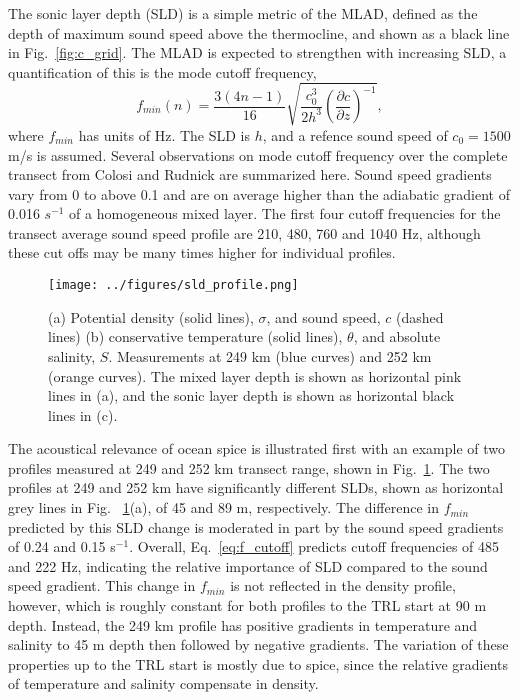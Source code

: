 \documentclass[preprint,NumberedRefs]{JASA}
\begin{document}
The sonic layer depth (SLD) is a simple metric of the MLAD, defined as the depth of maximum sound speed above the thermocline, and shown as a black line in Fig.~\ref{fig:c_grid}. The MLAD is expected to strengthen with increasing SLD, a quantification of this is the mode cutoff frequency\citep{Urick1982Prop},
\begin{equation}
    f_{min}(n) = \frac{3(4n-1)}{16} \sqrt{\frac{c_0^3}{2h^3} \left( \frac{\partial c}{\partial z} \right) ^ {-1}},
    \label{eq:f_cutoff}
\end{equation}
where $f_{min}$ has units of Hz. The SLD is $h$, and a refence sound speed of $c_0 = 1500$ m/s is assumed. Several observations on mode cutoff frequency over the complete transect from Colosi and Rudnick\cite{colosi2020observations} are summarized here. Sound speed gradients vary from 0 to above 0.1 and are on average higher than the adiabatic gradient of 0.016 $s^{-1}$ of a homogeneous mixed layer. The first four cutoff frequencies for the transect average sound speed profile are 210, 480, 760 and 1040 Hz, although these cut offs may be many times higher for individual profiles.

\begin{figure}
    \texttt{[image: ../figures/sld\_profile.png]}
    \caption{\label{fig:profiles}{(a) Potential density (solid lines), $\sigma$, and sound speed, $c$ (dashed lines) (b) conservative temperature (solid lines), $\theta$, and absolute salinity, $S$. Measurements at 249 km (blue curves) and 252 km (orange curves). The mixed layer depth is shown as horizontal pink lines in (a), and the sonic layer depth is shown as horizontal black lines in (c).}}
\end{figure}

The acoustical relevance of ocean spice is illustrated first with an example of two profiles measured at 249 and 252 km transect range, shown in Fig.~\ref{fig:profiles}. The two profiles at 249 and 252 km have significantly different SLDs, shown as horizontal grey lines in Fig. ~\ref{fig:profiles}(a), of 45 and 89 m, respectively. The difference in $f_{min}$ predicted by this SLD change is moderated in part by the sound speed gradients of 0.24 and 0.15 s$^{-1}$. Overall, Eq.~\eqref{eq:f_cutoff} predicts cutoff frequencies of 485 and 222 Hz, indicating the relative importance of SLD compared to the sound speed gradient. This change in $f_{min}$ is not reflected in the density profile, however, which is roughly constant for both profiles to the TRL start at 90 m depth. Instead, the 249 km profile has positive gradients in temperature and salinity to 45 m depth then followed by negative gradients. The variation of these properties up to the TRL start is mostly due to spice, since the relative gradients of temperature and salinity compensate in density.
\end{document}
